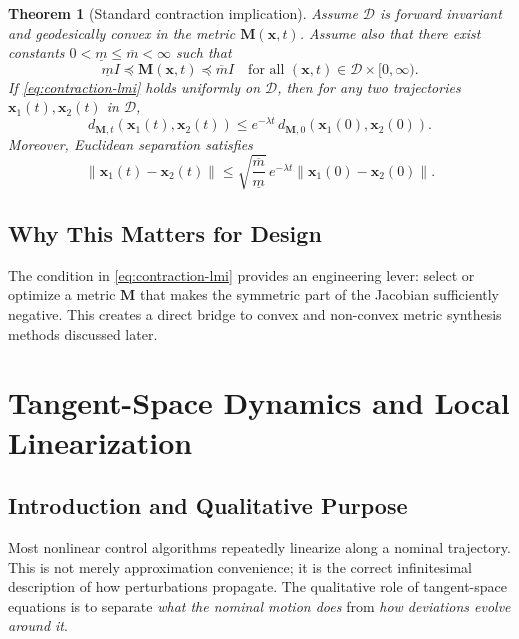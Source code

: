 \documentclass[11pt,letterpaper]{article}
\newtheorem{theorem}{Theorem}[section]
\newcommand{\norm}[1]{\left\lVert #1 \right\rVert}
\newcommand{\M}{\mathbf{M}}
\newcommand{\x}{\mathbf{x}}
\begin{document}
\begin{theorem}[Standard contraction implication]
Assume $\mathcal{D}$ is forward invariant and geodesically convex in the metric $\M(\x,t)$. Assume also that there exist constants $0<\underline{m}\leq \overline{m}<\infty$ such that
\begin{equation}
\underline{m}I \preceq \M(\x,t) \preceq \overline{m}I
\quad \text{for all } (\x,t)\in\mathcal{D}\times[0,\infty).
\label{eq:metric-bounds}
\end{equation}
If \eqref{eq:contraction-lmi} holds uniformly on $\mathcal{D}$, then for any two trajectories $\x_1(t),\x_2(t)$ in $\mathcal{D}$,
\begin{equation}
d_{\M,t}\!\left(\x_1(t),\x_2(t)\right)
\le e^{-\lambda t}\,d_{\M,0}\!\left(\x_1(0),\x_2(0)\right).
\label{eq:geodesic-decay}
\end{equation}
Moreover, Euclidean separation satisfies
\begin{equation}
\norm{\x_1(t)-\x_2(t)}
\le \sqrt{\frac{\overline{m}}{\underline{m}}}\,e^{-\lambda t}
\norm{\x_1(0)-\x_2(0)}.
\label{eq:euclidean-decay}
\end{equation}
\end{theorem}

\subsection{Why This Matters for Design}
The condition in \eqref{eq:contraction-lmi} provides an engineering lever: select or optimize a metric $\M$ that makes the symmetric part of the Jacobian sufficiently negative. This creates a direct bridge to convex and non-convex metric synthesis methods discussed later.

\section{Tangent-Space Dynamics and Local Linearization}

\subsection{Introduction and Qualitative Purpose}
Most nonlinear control algorithms repeatedly linearize along a nominal trajectory. This is not merely approximation convenience; it is the correct infinitesimal description of how perturbations propagate. The qualitative role of tangent-space equations is to separate \emph{what the nominal motion does} from \emph{how deviations evolve around it}.
\end{document}
